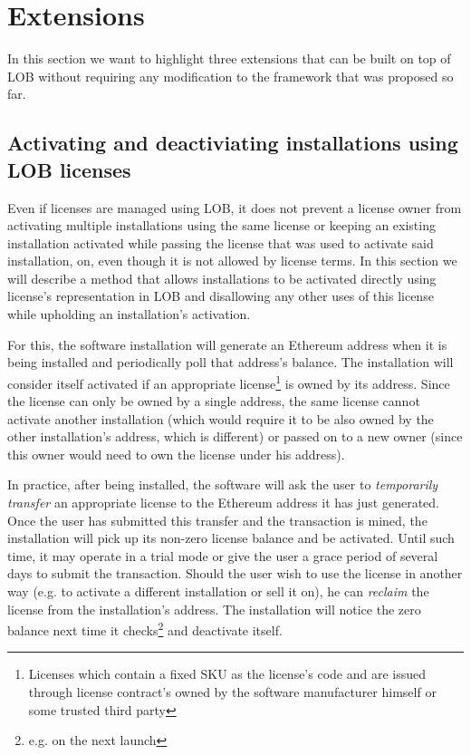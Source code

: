 \documentclass[a4paper]{article}
\begin{document}
\section{Extensions}
\label{ch:extensions}

In this section we want to highlight three extensions that can be built on top of LOB without requiring any modification to the framework that was proposed so far.

\subsection{Activating and deactiviating installations using LOB licenses}
\label{ch:installationActivation}

Even if licenses are managed using LOB, it does not prevent a license owner from activating multiple installations using the same license or keeping an existing installation activated while passing the license that was used to activate said installation, on, even though it is not allowed by license terms. In this section we will describe a method that allows installations to be activated directly using license's representation in LOB and disallowing any other uses of this license while upholding an installation's activation.

For this, the software installation will generate an Ethereum address when it is being installed and periodically poll that address's balance. The installation will consider itself activated if an appropriate license\footnote{Licenses which contain a fixed SKU as the license's code and are issued through license contract's owned by the software manufacturer himself or some trusted third party} is owned by its address. Since the license can only be owned by a single address, the same license cannot activate another installation (which would require it to be also owned by the other installation's address, which is different) or passed on to a new owner (since this owner would need to own the license under his address).

In practice, after being installed, the software will ask the user to \emph{temporarily transfer} an appropriate license to the Ethereum address it has just generated. Once the user has submitted this transfer and the transaction is mined, the installation will pick up its non-zero license balance and be activated. Until such time, it may operate in a trial mode or give the user a grace period of several days to submit the transaction. Should the user wish to use the license in another way (e.g. to activate a different installation or sell it on), he can \emph{reclaim} the license from the installation's address. The installation will notice the zero balance next time it checks\footnote{e.g. on the next launch} and deactivate itself.
\end{document}
